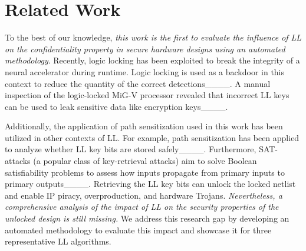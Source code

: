 \section{Related Work}
To the best of our knowledge, \textit{this work is the first to evaluate the influence of LL on the confidentiality property in secure hardware designs using an automated methodology}. Recently, logic locking has been exploited to break the integrity of a neural accelerator during runtime. Logic locking is used as a backdoor in this context to reduce the quantity of the correct detections____. A manual inspection of the logic-locked MiG-V processor revealed that incorrect LL keys can be used to leak sensitive data like encryption keys____.

Additionally, the application of path sensitization used in this work has been utilized in other contexts of LL. For example, path sensitization has been applied to analyze whether LL key bits are stored safely____. %
Furthermore, SAT-attacks (a popular class of key-retrieval attacks) aim to solve Boolean satisfiability problems to assess how inputs propagate from primary inputs to primary outputs____. Retrieving the LL key bits can unlock the locked netlist and enable IP piracy, overproduction, and hardware Trojans.
\textit{Nevertheless, a comprehensive analysis of the impact of LL on the security properties of the unlocked design is still missing.} We address this research gap by developing an automated methodology to evaluate this impact and showcase it for three representative LL algorithms.